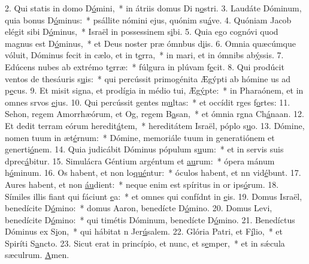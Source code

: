 2. Qui statis in domo D\uline{ó}mini,~* in átriis domus Di n\uline{o}stri.
3. Laudáte Dóminum, quia bonus D\uline{ó}minus:~* psállite nómini ejus, quónim su\uline{á}ve.
4. Quóniam Jacob elégit sibi D\uline{ó}minus,~* Israël in possessinem s\uline{i}bi.
5. Quia ego cognóvi quod magnus est D\uline{ó}minus,~* et Deus noster præ ómnbus d\uline{i}is.
6. Omnia quæcúmque vóluit, Dóminus fecit in cælo, et in t\uline{e}rra,~* in mari, et in ómnibs ab\uline{ý}ssis.
7. Edúcens nubes ab extrémo t\uline{e}rræ:~* fúlgura in plúvam f\uline{e}cit.
8. Qui prodúcit ventos de thesáuris s\uline{u}is:~* qui percússit primogénita Ægýpti ab hómine us ad p\uline{e}cus.
9. Et misit signa, et prodígia in médio tui, Æg\uline{ý}pte:~* in Pharaónem, et in omnes srvos \uline{e}jus.
10. Qui percússit gentes m\uline{u}ltas:~* et occídit rges f\uline{o}rtes:
11. Sehon, regem Amorrhæórum, et Og, regem B\uline{a}san,~* et ómnia rgna Ch\uline{á}naan.
12. Et dedit terram eórum heredit\uline{á}tem,~* hereditátem Israël, póplo s\uline{u}o.
13. Dómine, nomen tuum in æt\uline{é}rnum:~* Dómine, memoriále tuum in generatiónem et generti\uline{ó}nem.
14. Quia judicábit Dóminus pópulum s\uline{u}um:~* et in servis suis dprec\uline{á}bitur.
15. Simulácra Géntium argéntum et \uline{au}rum:~* ópera mánum h\uline{ó}minum.
16. Os habent, et non lo\uline{qué}ntur:~* óculos habent, et nn vid\uline{é}bunt.
17. Aures habent, et non \uline{áu}dient:~* neque enim est spíritus in or ips\uline{ó}rum.
18. Símiles illis fiant qui fáciunt \uline{e}a:~* et omnes qui confídnt in \uline{e}is.
19. Domus Israël, benedícite D\uline{ó}mino:~* domus Aaron, benedícte D\uline{ó}mino.
20. Domus Levi, benedícite D\uline{ó}mino:~* qui timétis Dóminum, benedícte D\uline{ó}mino.
21. Benedíctus Dóminus ex S\uline{i}on,~* qui hábitat n Jer\uline{ú}salem.
22. Glória Patri, et F\uline{í}lio,~* et Spiríti S\uline{a}ncto.
23. Sicut erat in princípio, et nunc, et s\uline{e}mper,~* et in sǽcula sæculrum. \uline{A}men.
